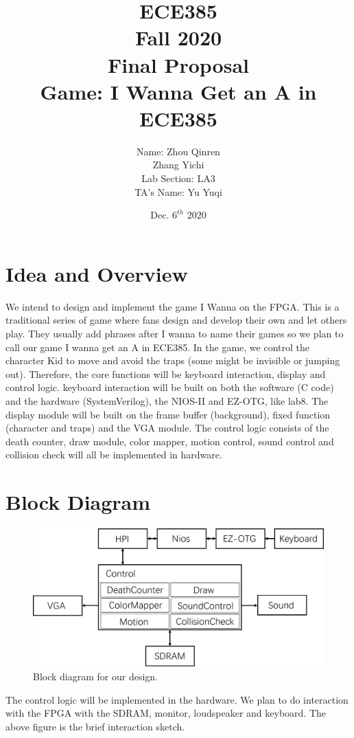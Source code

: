 \documentclass[12pt]{article}
\title{
    \textbf{\Huge ECE385} \\
    \huge Fall 2020 \\
    \huge Final Proposal \\[120pt]
    \textbf{\Huge Game: I Wanna Get an A in ECE385} \\[120pt]
    }
\author{
    \large Name: Zhou Qinren \\ 
            \quad\qquad Zhang Yichi \\ 
    \large Lab Section: LA3 \\ 
    \large TA's Name: Yu Yuqi
    }
\date{Dec. $6^{th}$ 2020}
\begin{document}
\setlength{\parindent}{0pt}
\maketitle
\newpage

\section{Idea and Overview}
We intend to design and implement the game I Wanna on the FPGA. This is a traditional series of game where fans design and develop their own and let others play. They usually add phrases after I wanna to name their games so we plan to call our game I wanna get an A in ECE385. In the game, we control the character Kid to move and avoid the traps (some might be invisible or jumping out). Therefore, the core functions will be keyboard interaction, display and control logic. keyboard interaction will be built on both the software (C code) and the hardware (SystemVerilog), the NIOS-II and EZ-OTG, like lab8. The display module will be built on the frame buffer (background), fixed function (character and traps) and the VGA module. The control logic consists of the death counter, draw module, color mapper, motion control, sound control and collision check will all be implemented in hardware.

\section{Block Diagram}
\begin{figure}[H]
    \centering
    \includegraphics[width=17cm]{blockdiagram.png}
    \caption{Block diagram for our design.}
\end{figure}

The control logic will be implemented in the hardware. We plan to do interaction with the FPGA with the SDRAM, monitor, loudspeaker and keyboard. The above figure is the brief interaction sketch.
\end{document}

